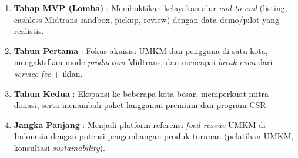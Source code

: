 \begin{enumerate}[leftmargin=*]
    \item \textbf{Tahap MVP (Lomba)} : Membuktikan kelayakan alur \textit{end-to-end} (listing, cashless
    Midtrans sandbox, pickup, review) dengan data demo/pilot yang realistis.

    \item \textbf{Tahun Pertama} : Fokus akuisisi UMKM dan pengguna di satu kota, mengaktifkan mode
    \textit{production} Midtrans, dan mencapai \textit{break even} dari \textit{service fee} + iklan.

    \item \textbf{Tahun Kedua} : Ekspansi ke beberapa kota besar, memperkuat mitra donasi, serta
    menambah paket langganan premium dan program CSR.

    \item \textbf{Jangka Panjang} : Menjadi platform referensi \textit{food rescue} UMKM di Indonesia
    dengan potensi pengembangan produk turunan (pelatihan UMKM, konsultasi \textit{sustainability}).
\end{enumerate}
